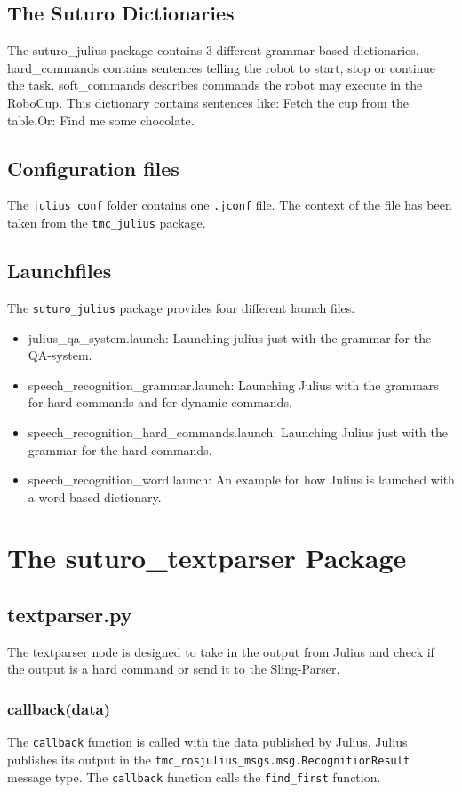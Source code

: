 \documentclass[main.tex]{subfiles}
\begin{document}
		\subsection{The Suturo Dictionaries}
		The suturo\_julius package contains 3 different grammar-based dictionaries. hard\_commands contains sentences telling the robot to start, stop or continue the task.
		soft\_commands describes commands the robot may execute in the RoboCup. This dictionary contains sentences like: Fetch the cup from the table.Or: Find me some chocolate.
		\subsection{Configuration files}
		The \texttt{julius\_conf} folder contains one \texttt{.jconf} file. The context of the file has been taken from the \texttt{tmc\_julius} package.
		\subsection{Launchfiles}
		The \texttt{suturo\_julius} package provides four different launch files.\\
		\begin{itemize}
			\item julius\_qa\_system.launch:
			\subitem Launching julius just with the grammar for the QA-system.
			\item speech\_recognition\_grammar.launch:
			\subitem Launching Julius with the grammars for hard commands and for dynamic commands.
			\item speech\_recognition\_hard\_commands.launch:
			\subitem Launching Julius just with the grammar for the hard commands.
			\item speech\_recognition\_word.launch:
			\subitem An example for how Julius is launched with a word based dictionary.
		\end{itemize}
	\section{The suturo\_textparser Package}
		\subsection{textparser.py}
		The textparser node is designed to take in the output from Julius and check if the output is a hard command or send it to the Sling-Parser.
		\subsubsection{callback(data)}
		The \texttt{callback} function is called with the data published by Julius. Julius publishes its output in the \texttt{tmc\_rosjulius\_msgs.msg.RecognitionResult} message type. The \texttt{callback} function calls the \texttt{find\_first} function.
		
\end{document}
